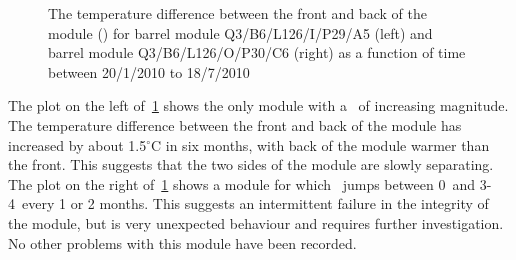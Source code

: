 \begin{figure}[h]
 	\centering
  \caption{The temperature difference between the front and back of the module
  (\deltat) for barrel module Q3/B6/L126/I/P29/A5 (left) and barrel module
  Q3/B6/L126/O/P30/C6 (right) as a function of time between 20/1/2010 to
  18/7/2010}
	\label{fig:pm_ev_dt}
\end{figure}

The plot on the left of~\ref{fig:pm_ev_dt} shows the only module with a \deltat\
of increasing magnitude. The temperature difference between the front and back
of the module has increased by about 1.5$^\circ$C in six months, with back of
the module warmer than the front. This suggests that the two sides of the module
are slowly separating. The plot on the right of~\ref{fig:pm_ev_dt} shows a
module for which \deltat\ jumps between 0\dc\ and 3-4\dc\ every 1 or 2 months.
This suggests an intermittent failure in the integrity of the module, but is
very unexpected behaviour and requires further investigation. No other problems
with this module have been recorded.

